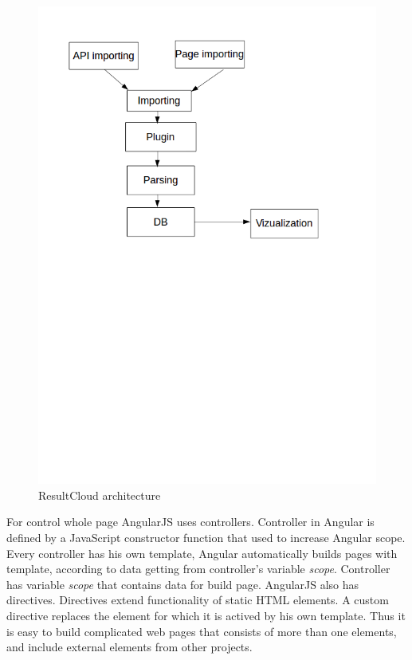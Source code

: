 \begin{figure}
  \centering
    \includegraphics[trim=0 13.41cm 0 0,scale=0.5]{fig/result-cloud.png}
  \caption{ResultCloud architecture}
  \label{fig:result_cloud}
\end{figure}

For control whole page AngularJS uses controllers. Controller in Angular is defined by a JavaScript constructor function that used to increase Angular scope. Every controller has his own template, Angular automatically builds pages with template, according to data getting from controller's variable \emph{scope}. Controller has variable \emph{scope} that contains data for build page. AngularJS also has directives. Directives extend functionality of static HTML elements. A custom directive replaces the element for which it is actived by his own template. Thus it is easy to build complicated web pages that consists of more than one elements, and include external elements from other projects.

